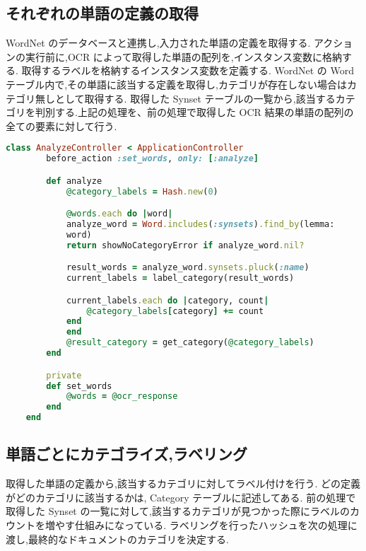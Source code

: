 \clearpage

\subsection{それぞれの単語の定義の取得}
\label{sebsec:app_synset}

WordNet のデータベースと連携し,入力された単語の定義を取得する.
アクションの実行前に,OCR によって取得した単語の配列を,インスタンス変数に格納する.
取得するラベルを格納するインスタンス変数を定義する. WordNet の Word テーブル内で,その単語に該当する定義を取得し,カテゴリが存在しない場合はカテゴリ無しとして取得する.
取得した Synset テーブルの一覧から,該当するカテゴリを判別する.上記の処理を、前の処理で取得した OCR 結果の単語の配列の全ての要素に対して行う.

\begin{lstlisting}[language=Ruby, caption=ActiveRecord による WordNet との連携]
    class AnalyzeController < ApplicationController
        before_action :set_words, only: [:analyze]

        def analyze
            @category_labels = Hash.new(0)

            @words.each do |word|
            analyze_word = Word.includes(:synsets).find_by(lemma:
            word)
            return showNoCategoryError if analyze_word.nil?

            result_words = analyze_word.synsets.pluck(:name)
            current_labels = label_category(result_words)

            current_labels.each do |category, count|
                @category_labels[category] += count
            end
            end
            @result_category = get_category(@category_labels)
        end

        private
        def set_words
            @words = @ocr_response
        end
    end
\end{lstlisting}


\clearpage

\subsection{単語ごとにカテゴライズ,ラベリング}
\label{sebsec:app_categolize}

取得した単語の定義から,該当するカテゴリに対してラベル付けを行う.
どの定義がどのカテゴリに該当するかは, Category テーブルに記述してある.
前の処理で取得した Synset の一覧に対して,該当するカテゴリが見つかった際にラベルのカウントを増やす仕組みになっている.
ラベリングを行ったハッシュを次の処理に渡し,最終的なドキュメントのカテゴリを決定する.

